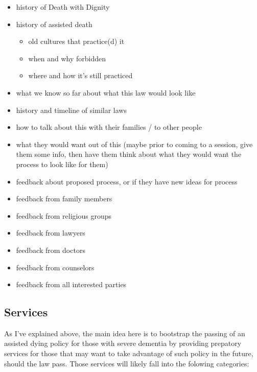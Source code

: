 \documentclass{proposalnsf}
\begin{document}
\bigskip
{}
      \begin{itemize}
        \item{history of Death with Dignity}
        \item{history of assisted death}
        \begin{itemize}
          \item{old cultures that practice(d) it}
          \item{when and why forbidden}
          \item{where and how it's still practiced}
        \end{itemize}
        \item{what we know so far about what this law would look like}
        \item{history and timeline of similar laws}
        \item{how to talk about this with their families / to other people}
      \end{itemize}

\bigskip
{}
      \begin{itemize}
        \item{what they would want out of this (maybe prior to coming to a session, give them some info, then have them think about what they would want the process to look like for them)}
        \item{feedback about proposed process, or if they have new ideas for process}
        \item{feedback from family members}
        \item{feedback from religious groups}
        \item{feedback from lawyers}
        \item{feedback from doctors}
        \item{feedback from counselors}
        \item{feedback from all interested parties}
      \end{itemize}

\subsection{Services}


As I've explained above, the main idea here is to bootstrap the passing of an assisted dying policy for those with severe dementia by providing prepatory services for those that may want to take advantage of such policy in the future, should the law pass. Those services will likely fall into the folowing categories:
\end{document}
